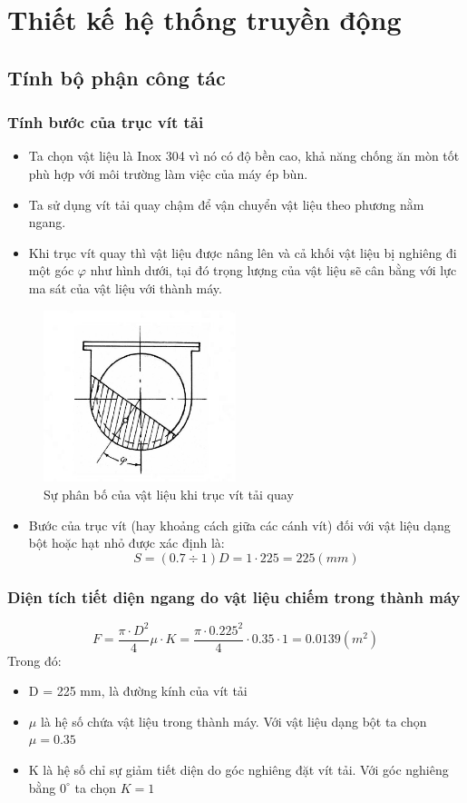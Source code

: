 \chapter{Thiết kế hệ thống truyền động}
\section{Tính bộ phận công tác}
\subsection{Tính bước của trục vít tải}
\begin{itemize}
    \item Ta chọn vật liệu là Inox 304 vì nó có độ bền cao, khả năng chống ăn mòn tốt phù hợp với môi trường làm việc của máy ép bùn.
    \item Ta sử dụng vít tải quay chậm để vận chuyển vật liệu theo phương nằm ngang. 
    \item Khi trục vít quay thì vật liệu được nâng lên và cả khối vật liệu bị nghiêng đi một góc $\varphi $ như hình dưới, tại đó trọng lượng của vật liệu sẽ cân bằng với lực ma sát của vật liệu với thành máy.
\end{itemize}
\begin{figure}[H]
    \centering
    \includegraphics[width=0.5\textwidth]{pictures/vittai1.png}
    \caption{Sự phân bố của vật liệu khi trục vít tải quay}
\end{figure}

\begin{itemize}
    \item Bước của trục vít (hay khoảng cách giữa các cánh vít) đối với vật liệu dạng bột hoặc hạt nhỏ được xác định là:
    \[
        S = (0.7 \div 1)D = 1 \cdot 225 = 225 (mm) 
    \]
\end{itemize}

\subsection{Diện tích tiết diện ngang do vật liệu chiếm trong thành máy}
\[
    F = \frac{\pi\cdot D^2}{4}\mu \cdot K = \frac{\pi\cdot 0.225^2}{4}\cdot 0.35\cdot 1 = 0.0139 (m^2)
\]
Trong đó: 
\begin{itemize}
    \item D = 225 mm, là đường kính của vít tải
    \item $\mu$ là hệ số chứa vật liệu trong thành máy. Với vật liệu dạng bột ta chọn $\mu = 0.35$
    \item K là hệ số chỉ sự giảm tiết diện do góc nghiêng đặt vít tải. Với góc nghiêng bằng $0^{\circ}$ ta chọn $K = 1$
\end{itemize}
